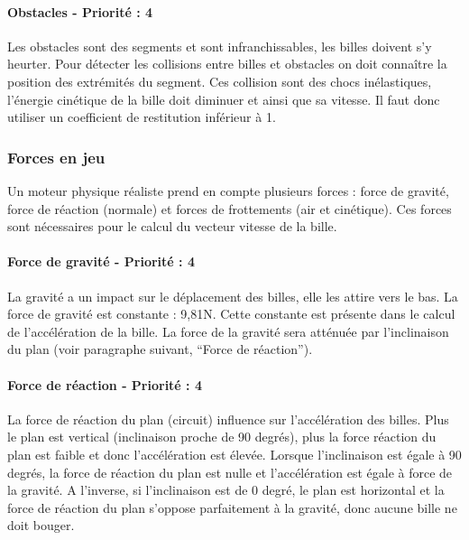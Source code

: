 \documentclass{report}
\begin{document}
\paragraph{Obstacles - Priorité : 4}

Les obstacles sont des segments et sont infranchissables, les billes doivent s'y heurter. Pour détecter les collisions entre billes et obstacles on doit connaître la position des extrémités du segment. Ces collision sont des chocs inélastiques, l’énergie cinétique de la bille doit diminuer et ainsi que sa vitesse. Il faut donc utiliser un coefficient de restitution inférieur à 1.

\newpage
\subsubsection{Forces en jeu}

Un moteur physique réaliste prend en compte plusieurs forces : force de gravité, force de réaction (normale) et forces de frottements (air et cinétique). Ces forces sont nécessaires pour le calcul du vecteur vitesse de la bille.

\paragraph{Force de gravité - Priorité : 4}

La gravité a un impact sur le déplacement des billes, elle les attire vers le bas. La force de gravité est constante : 9,81N. Cette constante est présente dans le calcul de l’accélération de la bille. La force de la gravité sera atténuée par l’inclinaison du plan (voir paragraphe suivant, “Force de réaction”). 

\paragraph{Force de réaction - Priorité : 4}

La force de réaction du plan (circuit) influence sur l’accélération des billes. Plus le plan est vertical (inclinaison proche de 90 degrés), plus la force réaction du plan est faible et donc l’accélération est élevée. Lorsque l’inclinaison est égale à 90 degrés, la force de réaction du plan est nulle et l’accélération est égale à force de la gravité. A l’inverse, si l’inclinaison est de 0 degré, le plan est horizontal et la force de réaction du plan s’oppose parfaitement à la gravité, donc aucune bille ne doit bouger. \\
\end{document}
